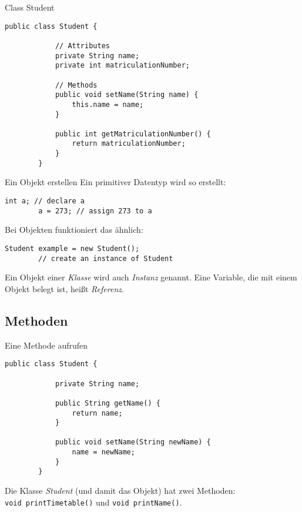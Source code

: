 \begin{frame}[fragile]{Class Student}
    \begin{lstlisting}[gobble=8]
        public class Student {

            // Attributes
            private String name; 
            private int matriculationNumber; 

            // Methods
            public void setName(String name) {
                this.name = name;
            }

            public int getMatriculationNumber() {
                return matriculationNumber;
            }
        }
    \end{lstlisting}


\end{frame}

\begin{frame}[fragile]{Ein Objekt erstellen}
	Ein primitiver Datentyp wird so erstellt:
    \begin{lstlisting}[gobble=8]
	    int a; // declare a
	    a = 273; // assign 273 to a
	\end{lstlisting}
    \pause
	Bei Objekten funktioniert das ähnlich:
    \begin{lstlisting}[gobble=8]
	    Student example = new Student(); 
		// create an instance of Student
	\end{lstlisting}
    \pause
    Ein Objekt einer \textit{Klasse} wird auch \textit{Instanz} genannt.
	Eine Variable, die mit einem Objekt belegt ist, heißt \textit{Referenz}.
\end{frame}

\subsection{Methoden}
\begin{frame}[fragile]{Eine Methode aufrufen}
	\begin{lstlisting}[gobble=8]
        public class Student {
        
            private String name;
        
            public String getName() {
                return name;
            }
            
            public void setName(String newName) {
                name = newName;
            }
        }
	\end{lstlisting}
    Die Klasse \emph{Student} (und damit das Objekt) hat zwei Methoden: \\  \texttt{void printTimetable()} und \texttt{void printName()}.
\end{frame}

